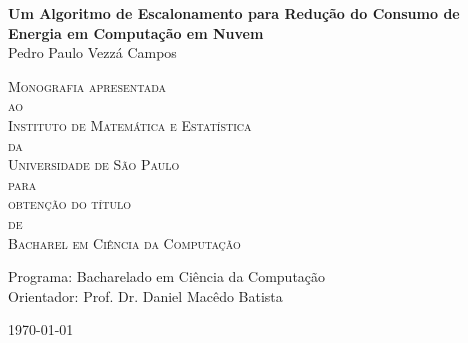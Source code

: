 \documentclass[11pt,twoside,a4paper]{book}
\begin{document}
\newcommand{\ttt}[1]{\texttt{#1}}

\frontmatter 
\fancyhead[RO]{{\footnotesize\rightmark}\hspace{2em}\thepage}
\setcounter{tocdepth}{2}
\fancyhead[LE]{\thepage\hspace{2em}\footnotesize{\leftmark}}
\fancyhead[RE,LO]{}
\fancyhead[RO]{{\footnotesize\rightmark}\hspace{2em}\thepage}

\onehalfspacing  %

\thispagestyle{empty}
\begin{center}
\vspace*{2.3cm}
\textbf{\Large{Um Algoritmo de Escalonamento para Redução do Consumo de
Energia em Computação em Nuvem}}\\

\vspace*{1.2cm}
\Large{Pedro Paulo Vezzá Campos}

\vskip 2cm
\textsc{
Monografia apresentada\\[-0.25cm] 
ao\\[-0.25cm]
Instituto de Matemática e Estatística\\[-0.25cm]
da\\[-0.25cm]
Universidade de São Paulo\\[-0.25cm]
para\\[-0.25cm]
obtenção do título\\[-0.25cm]
de\\[-0.25cm]
Bacharel em Ciência da Computação}

\vskip 1.5cm
Programa: Bacharelado em Ciência da Computação\\
Orientador: Prof. Dr. Daniel Macêdo Batista\\

\vskip 1cm

\vskip 0.5cm
\normalsize{\today}
\end{center}
\end{document}
